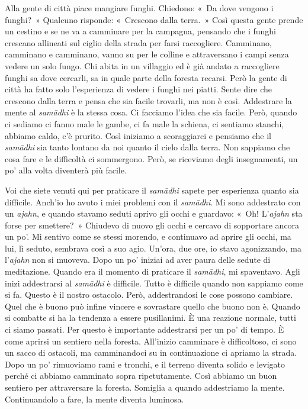 Alla gente di città piace mangiare funghi. Chiedono: «~Da dove vengono i
funghi?~» Qualcuno risponde: «~Crescono dalla terra.~» Così questa gente
prende un cestino e se ne va a camminare per la campagna, pensando che i
funghi crescano allineati sul ciglio della strada per farsi raccogliere.
Camminano, camminano e camminano, vanno su per le colline e attraversano
i campi senza vedere un solo fungo. Chi abita in un villaggio ed è già
andato a raccogliere funghi sa dove cercarli, sa in quale parte della
foresta recarsi. Però la gente di città ha fatto solo l'esperienza di
vedere i funghi nei piatti. Sente dire che crescono dalla terra e pensa
che sia facile trovarli, ma non è così. Addestrare la mente al
\emph{samādhi} è la stessa cosa. Ci facciamo l'idea che sia facile.
Però, quando ci sediamo ci fanno male le gambe, ci fa male la schiena,
ci sentiamo stanchi, abbiamo caldo, c'è prurito. Così iniziamo a
scoraggiarci e pensiamo che il \emph{samādhi} sia tanto lontano da noi
quanto il cielo dalla terra. Non sappiamo che cosa fare e le difficoltà
ci sommergono. Però, se riceviamo degli insegnamenti, un po' alla volta
diventerà più facile.

Voi che siete venuti qui per praticare il \emph{samādhi} sapete per
esperienza quanto sia difficile. Anch'io ho avuto i miei problemi con il
\emph{samādhi}. Mi sono addestrato con un \emph{ajahn}, e quando stavamo
seduti aprivo gli occhi e guardavo: «~Oh! L'\emph{ajahn} sta forse per
smettere?~» Chiudevo di nuovo gli occhi e cercavo di sopportare ancora
un po'. Mi sentivo come se stessi morendo, e continuavo ad aprire gli
occhi, ma lui, lì seduto, sembrava così a suo agio. Un'ora, due ore, io
stavo agonizzando, ma l'\emph{ajahn} non si muoveva. Dopo un po' iniziai
ad aver paura delle sedute di meditazione. Quando era il momento di
praticare il \emph{samādhi}, mi spaventavo. Agli inizi addestrarsi al
\emph{samādhi} è difficile. Tutto è difficile quando non sappiamo come
si fa. Questo è il nostro ostacolo. Però, addestrandosi le cose possono
cambiare. Quel che è buono può infine vincere e sovrastare quello che
buono non è. Quando si combatte si ha la tendenza a essere pusillanimi.
È una reazione normale, tutti ci siamo passati. Per questo è importante
addestrarsi per un po' di tempo. È come aprirsi un sentiero nella
foresta. All'inizio camminare è difficoltoso, ci sono un sacco di
ostacoli, ma camminandoci su in continuazione ci apriamo la strada. Dopo
un po' rimuoviamo rami e tronchi, e il terreno diventa solido e levigato
perché ci abbiamo camminato sopra ripetutamente. Così abbiamo un buon
sentiero per attraversare la foresta. Somiglia a quando addestriamo la
mente. Continuandolo a fare, la mente diventa luminosa.

